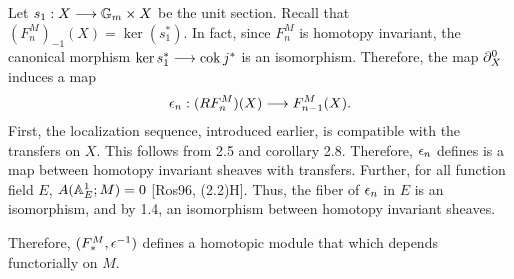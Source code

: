 Let $s_1: X \to \Gmpt \times X$ be the unit section. Recall that
$(F^M_n)_{-1}(X) = \ker (s_1^*)$. In fact, since $F^M_n$ is 
homotopy invariant, the canonical morphism $\ker s_1^* \to
\cok j^*$ is an isomorphism. Therefore, the map $\ptres{0}{X}$ 
induces a map
\[
\loopCM_n : (RF^M_{n})(X) \to F^M_{n - 1}(X).
\]
First, the localization sequence, introduced earlier, is 
compatible with the transfers on $X$. This follows from 2.5 and 
corollary 2.8. Therefore, $\loopCM_n$ defines is a map between 
homotopy invariant sheaves with transfers. Further, for all 
function field $E$, $\cmcohom(\A^1_E; M) = 0$ [Ros96, (2.2)H]. 
Thus, the fiber of $\loopCM_n$ in $E$ is an isomorphism, and by 
1.4, an isomorphism between homotopy invariant sheaves.

Therefore, $(F^M_*, \loopCM^{-1})$ defines a homotopic module that
which depends functorially on $M$.
